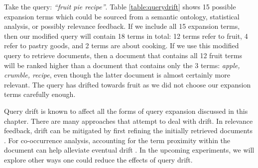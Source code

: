 Take the query: \textit{``fruit pie recipe''}. Table \ref{table:querydrift} shows 15 possible expansion terms which could be sourced from a semantic ontology, statistical analysis, or possibly relevance feedback. If we include all 15 expansion terms, then our modified query will contain 18 terms in total: 12 terms refer to fruit, 4 refer to pastry goods, and 2 terms are about cooking. If we use this modified query to retrieve documents, then a document that contains all 12 fruit terms will be ranked higher than a document that contains only the 3 terms: \textit{apple, crumble, recipe}, even though the latter document is almost certainly more relevant. The query has drifted towards fruit as we did not choose our expansion terms carefully enough.

Query drift is known to affect all the forms of query expansion discussed in this chapter. There are many approaches that attempt to deal with drift. In relevance feedback, drift can be mitigated by first refining the initially retrieved documents \cite{Mitra:1998:IAQ:290941.290995}. For co-occurrence analysis, accounting for the term proximity within the document can help alleviate eventual drift \cite{Xu:2000:IEI:333135.333138}. In the upcoming experiments, we will explore other ways one could reduce the effects of query drift.

